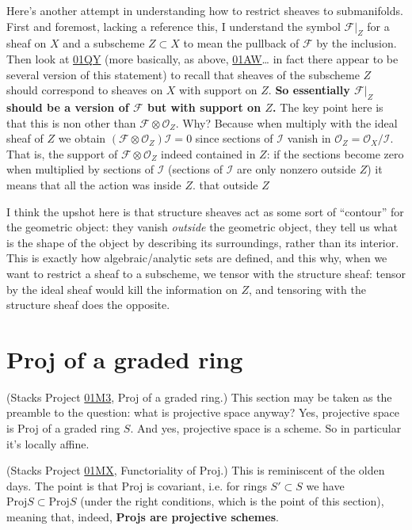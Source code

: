 \medskip\noindent
Here's another attempt in understanding how 
to restrict sheaves to submanifolds.
First and foremost, lacking a reference this,
I understand the symbol $\mathcal{F}|_Z$ for a sheaf
on $X$ and a subscheme  $Z \subset X$ to mean the
pullback of $\mathcal{F}$ by the inclusion.
Then look at \href{https://stacks.math.columbia.edu/tag/01QY}{01QY}
(more basically, as above, 
\href{https://stacks.math.columbia.edu/tag/01AW}{01AW}…
in fact there appear to be several version of this statement)
to recall that sheaves of the subscheme $Z$ should correspond
to sheaves on $X$ with support on $Z$.
{\bf So essentially $\mathcal{F}|_Z$ should be a version of $\mathcal{F}$ 
but with support on $Z$.}
The key point here is that this is non other than
$\mathcal{F} \otimes \mathcal{O}_Z$.
Why? Because when multiply with the ideal sheaf of $Z$ we obtain
$(\mathcal{F} \otimes \mathcal{O}_Z)\mathcal{I}=0$
since sections of $\mathcal{I}$ 
vanish in $\mathcal{O}_Z=\mathcal{O}_X/\mathcal{I}$.
That is, the support of $\mathcal{F} \otimes \mathcal{O}_Z$ indeed
contained in $Z$: if the sections become zero when
multiplied by sections of $\mathcal{I}$ 
(sections of $\mathcal{I}$ are only nonzero outside $Z$)
it means that all the action was inside $Z$.
that outside $Z$ 

I think the upshot here is that structure sheaves
act as some sort of ``contour'' for the geometric object:
they vanish {\it outside} the geometric object,
they tell us what is the shape of the object
by describing its surroundings, rather than its interior.
This is exactly how algebraic/analytic sets are defined,
and this why, when we want to restrict a sheaf
to a subscheme, we tensor with the structure sheaf:
tensor by the ideal sheaf would kill the information on $Z$,
and tensoring with the structure sheaf does the opposite.




\section{Proj of a graded ring}
\label{section-proj}

\noindent
(Stacks Project 
\href{https://stacks.math.columbia.edu/tag/01M3}{01M3},
Proj of a graded ring.)
This section may be taken as the preamble to
the question: what is projective space anyway?
Yes, projective space is Proj of a graded ring $S$.
And yes, projective space is a scheme.
So in particular it's locally affine.

(Stacks Project 
\href{https://stacks.math.columbia.edu/tag/01MX}{01MX},
Functoriality of Proj.) 
This is reminiscent of the olden days.
The point is that Proj is covariant,
i.e. for rings  $S' \subset S$ we have
$\text{Proj}S \subset \text{Proj}S$
(under the right conditions,
which is the point of this section),
meaning that, indeed,
{\bf Projs are projective schemes}.



